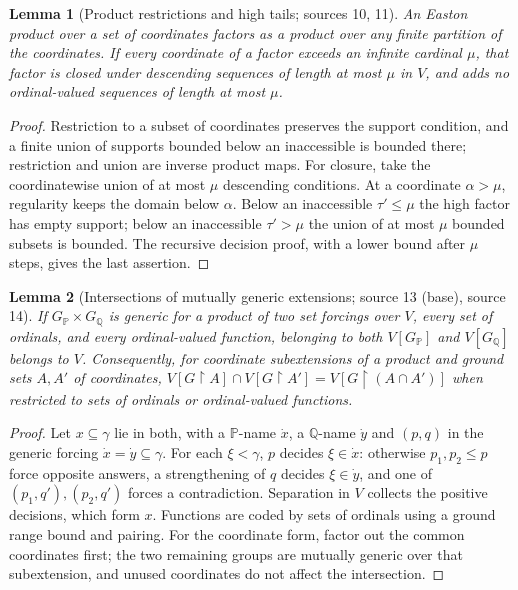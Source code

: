 \documentclass[11pt,letterpaper]{article}
\numberwithin{equation}{section}
\newtheorem{lemma}[lemma]{Lemma}
\theoremstyle{definition}
\theoremstyle{remark}
\newcommand{\res}{\mathbin{\upharpoonright}}
\begin{document}
\begin{lemma}[Product restrictions and high tails; sources 10, 11]\label{univ:gs:lem:high}
An Easton product over a set of coordinates factors as a product over any finite
partition of the coordinates. If every coordinate of a factor exceeds an infinite
cardinal $\mu$, that factor is closed under descending sequences of length at most
$\mu$ in $V$, and adds no ordinal-valued sequences of length at most $\mu$.
\end{lemma}
\begin{proof}
Restriction to a subset of coordinates preserves the support condition, and a finite
union of supports bounded below an inaccessible is bounded there; restriction and
union are inverse product maps. For closure, take the coordinatewise union of at most
$\mu$ descending conditions. At a coordinate $\alpha>\mu$, regularity keeps the domain
below $\alpha$. Below an inaccessible $\tau'\le\mu$ the high factor has empty support;
below an inaccessible $\tau'>\mu$ the union of at most $\mu$ bounded subsets is bounded.
The recursive decision proof, with a lower bound after $\mu$ steps, gives the last
assertion.
\end{proof}

\begin{lemma}[Intersections of mutually generic extensions; source 13 (base), source 14]\label{univ:gs:lem:intersection}
If $G_{\mathbb P}\times G_{\mathbb Q}$ is generic for a product of two set forcings over
$V$, every set of ordinals, and every ordinal-valued function, belonging to both
$V[G_{\mathbb P}]$ and $V[G_{\mathbb Q}]$ belongs to $V$. Consequently, for coordinate
subextensions of a product and ground sets $A,A'$ of coordinates,
$V[G\res A]\cap V[G\res A']=V[G\res(A\cap A')]$ when restricted to sets of ordinals or
ordinal-valued functions.
\end{lemma}
\begin{proof}
Let $x\subseteq\gamma$ lie in both, with a $\mathbb P$-name $\dot x$, a $\mathbb Q$-name
$\dot y$ and $(p,q)$ in the generic forcing $\dot x=\dot y\subseteq\gamma$. For each
$\xi<\gamma$, $p$ decides $\xi\in\dot x$: otherwise $p_1,p_2\le p$ force opposite
answers, a strengthening of $q$ decides $\xi\in\dot y$, and one of $(p_1,q'),(p_2,q')$
forces a contradiction. Separation in $V$ collects the positive decisions, which form
$x$. Functions are coded by sets of ordinals using a ground range bound and pairing.
For the coordinate form, factor out the common coordinates first; the two remaining
groups are mutually generic over that subextension, and unused coordinates do not
affect the intersection.
\end{proof}
\end{document}
